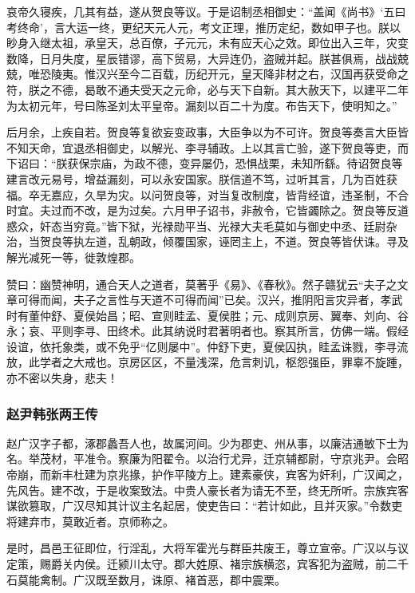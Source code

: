 \documentclass[]{article}
\begin{document}
哀帝久寝疾，几其有益，遂从贺良等议。于是诏制丞相御史：``盖闻《尚书》`五曰考终命'，言大运一终，更纪天元人元，考文正理，推历定纪，数如甲子也。朕以眇身入继太祖，承皇天，总百僚，子元元，未有应天心之效。即位出入三年，灾变数降，日月失度，星辰错谬，高下贸易，大异连仍，盗贼并起。朕甚俱焉，战战兢兢，唯恐陵夷。惟汉兴至今二百载，历纪开元，皇天降非材之右，汉国再获受命之符，朕之不德，曷敢不通夫受天之元命，必与天下自新。其大赦天下，以建平二年为太初元年，号曰陈圣刘太平皇帝。漏刻以百二十为度。布告天下，使明知之。''

后月余，上疾自若。贺良等复欲妄变政事，大臣争以为不可许。贺良等奏言大臣皆不知天命，宜退丞相御史，以解光、李寻辅政。上以其言亡验，遂下贺良等吏，而下诏曰：``朕获保宗庙，为政不德，变异屡仍，恐惧战栗，未知所繇。待诏贺良等建言改元易号，增益漏刻，可以永安国家。朕信道不笃，过听其言，几为百姓获福。卒无嘉应，久旱为灾。以问贺良等，对当复改制度，皆背经谊，违圣制，不合时宜。夫过而不改，是为过矣。六月甲子诏书，非赦令，它皆蠲除之。贺良等反道惑众，奸态当穷竟。''皆下狱，光禄勋平当、光禄大夫毛莫如与御史中丞、廷尉杂治，当贺良等执左道，乱朝政，倾覆国家，诬罔主上，不道。贺良等皆伏诛。寻及解光减死一等，徙敦煌郡。

赞曰：幽赞神明，通合天人之道者，莫著乎《易》、《春秋》。然子赣犹云``夫子之文章可得而闻，夫子之言性与天道不可得而闻''已矣。汉兴，推阴阳言灾异者，孝武时有董仲舒、夏侯始昌；昭、宣则眭孟、夏侯胜；元、成则京房、翼奉、刘向、谷永；哀、平则李寻、田终术。此其纳说时君著明者也。察其所言，仿佛一端。假经设谊，依托象类，或不免乎``亿则屡中''。仲舒下吏，夏侯囚执，眭孟诛戮，李寻流放，此学者之大戒也。京房区区，不量浅深，危言刺讥，枢怨强臣，罪辜不旋踵，亦不密以失身，悲夫！

\hypertarget{header-n5419}{%
\subsubsection{赵尹韩张两王传}\label{header-n5419}}

赵广汉字子都，涿郡蠡吾人也，故属河间。少为郡吏、州从事，以廉洁通敏下士为名。举茂材，平准令。察廉为阳翟令。以治行尤异，迁京辅都尉，守京兆尹。会昭帝崩，而新丰杜建为京兆掾，护作平陵方上。建素豪侠，宾客为奸利，广汉闻之，先风告。建不改，于是收案致法。中贵人豪长者为请无不至，终无所听。宗族宾客谋欲篡取，广汉尽知其计议主名起居，使吏告曰：``若计如此，且并灭家。''令数吏将建弃市，莫敢近者。京师称之。

是时，昌邑王征即位，行淫乱，大将军霍光与群臣共废王，尊立宣帝。广汉以与议定策，赐爵关内侯。迁颍川太守。郡大姓原、褚宗族横恣，宾客犯为盗贼，前二千石莫能禽制。广汉既至数月，诛原、褚首恶，郡中震栗。
\end{document}
